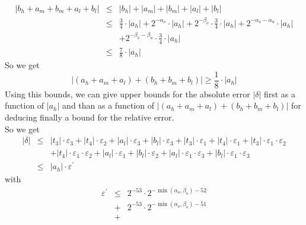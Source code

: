 \documentclass[a4paper,10pt,twoside]{article}
\newenvironment{proof}[1][Proof]{\begin{trivlist}
\item[\hskip \labelsep {\bfseries #1}]}{\end{trivlist}}
\newcommand{\hi}{\ensuremath{\mathit{h}}}
\newcommand{\mi}{\ensuremath{\mathit{m}}}
\newcommand{\lo}{\ensuremath{\mathit{l}}}
\renewcommand{\epsilon}{\varepsilon}
\begin{document}
\begin{proof}
\begin{eqnarray*}
\left \vert b_\hi + a_\mi + b_\mi + a_\lo + b_\lo \right \vert & \leq &
\left \vert b_\hi \right \vert + \left \vert a_\mi \right \vert + \left \vert b_\mi \right \vert + \left \vert a_\lo \right \vert +
\left \vert b_\lo \right \vert \\
& \leq & \frac{3}{4} \cdot \left \vert a_\hi \right \vert + 2^{-\alpha_o} \cdot \left \vert a_\hi \right \vert +
2^{-\beta_o} \cdot \frac{3}{4} \cdot \left \vert a_\hi \right \vert + 2^{-\alpha_o-\alpha_u} \cdot \left \vert a_\hi \right \vert \\ & &
+ 2^{-\beta_o-\beta_u} \cdot \frac{3}{4} \cdot \left \vert a_\hi \right \vert \\
& \leq & \frac{7}{8} \cdot \left \vert a_\hi \right \vert
\end{eqnarray*}
So we get
$$\left \vert \left( a_\hi + a_\mi + a_\lo \right) + \left( b_\hi + b_\mi + b_\lo \right) \right \vert
\geq \frac{1}{8} \cdot \left \vert a_\hi \right \vert$$
Using this bounds, we can give upper bounds for the absolute error $\left
  \vert \delta \right \vert$ first as a function of $\left \vert a_\hi \right
\vert$ and than as a function of
$\left \vert \left( a_\hi + a_\mi + a_\lo \right) + \left( b_\hi + b_\mi +
    b_\lo \right) \right \vert$ for
deducing finally a bound for the relative error. \\
So we get
\begin{eqnarray*}
\left \vert \delta \right \vert & \leq & \left \vert t_3 \right \vert \cdot \epsilon_3 + \left \vert t_4 \right \vert \cdot \epsilon_2 +
\left \vert a_\lo \right \vert \cdot \epsilon_3 + \left \vert b_\lo \right \vert \cdot \epsilon_3 + \left \vert t_3 \right \vert \cdot \epsilon_1
+ \left \vert t_4 \right \vert \cdot \epsilon_1 + \left \vert t_3 \right \vert \cdot \epsilon_1 \cdot \epsilon_2 \\
& & + \left \vert t_4 \right \vert \cdot \epsilon_1 \cdot \epsilon_2 + \left \vert a_\lo \right \vert \cdot \epsilon_1 +
\left \vert b_\lo \right \vert \cdot \epsilon_2 + \left \vert a_\lo \right \vert \cdot \epsilon_1 \cdot \epsilon_3 +
\left \vert b_\lo \right \vert \cdot \epsilon_1 \cdot \epsilon_3 \\
& \leq & \left \vert a_\hi \right \vert \cdot \epsilon^\prime
\end{eqnarray*}
with
\begin{eqnarray*}
\epsilon^\prime & \leq &
2^{-53} \cdot 2^{-\min\left(\alpha_o,\beta_o\right)-52} \\ & + &
2^{-53} \cdot 2^{-\min\left(\alpha_o,\beta_o\right)-51} \\ & + &

\end{eqnarray*}
\end{proof}
\end{document}
